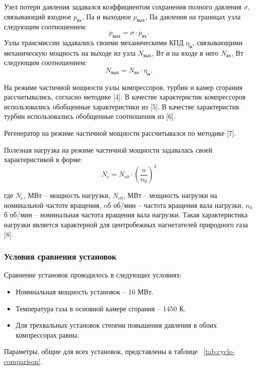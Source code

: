 Узел потери давления задавался коэффициентом сохранения полного давления $\sigma$, связывающий входное $p_{вх}$, Па и выходное $p_{вых}$, Па давления на границах узла следующим соотношением:
$$
p_{вых} = \sigma \cdot p_{вх}.
$$
Узлы трансмиссии задавались своими механическими КПД $\eta_м$, связывающими механическую мощность на выходе из узла $N_{вых}$, Вт и на входе в него $N_{вх}$, Вт следующим соотношением:
$$
N_{вых} = N_{вх} \cdot \eta_м.
$$

На режиме частичной мощности узлы компрессоров, турбин и камер сгорания рассчитывались, согласно методике [4]. В качестве характеристик компрессоров использовались обобщенные характеристики из [5]. В качестве характеристик турбин использовались обобщенные соотношения из [6].

Регенератор на режиме частичной мощности рассчитывался по методике [7].

Полезная нагрузка на режиме частичной мощности задавалась своей характеристикой в форме:
$$
N_e = N_{e0} \cdot \left( \frac{n}{n_0} \right)^3
$$

где $N_e$, МВт – мощность нагрузки, $N_{e0}$, МВт – мощность нагрузки на номинальной частоте вращения,  $n$б об/мин – частота вращения вала нагрузки, $n_0$б об/мин – номинальная частота вращения вала нагрузки. Такая характеристика нагрузки является характерной для центробежных нагнетателей природного газа [8].

\subsubsection{Условия сравнения установок}

Сравнение установок проводилось в следующих условиях:
\begin{itemize}
	\item Номинальная мощность установок – 16 МВт.
	\item Температура газа в основной камере сгорания – 1450 К.
	\item Для трехвальных установок степени повышения давления в обоих компрессорах равны.
\end{itemize}

Параметры, общие для всех установок, представлены в таблице ~\ref{tab:cycle-comparison}.

